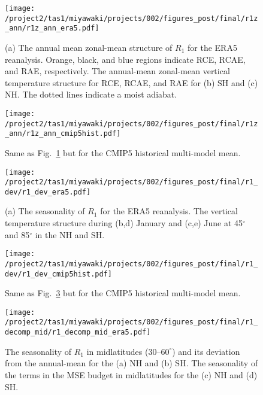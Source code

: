 \documentclass{ametsocV5}
\begin{document}
\begin{figure}[t]
  \noindent\texttt{[image: /project2/tas1/miyawaki/projects/002/figures\_post/final/r1z\_ann/r1z\_ann\_era5.pdf]}\\
  \caption{(a) The annual mean zonal-mean structure of $R_{1}$ for the ERA5 reanalysis. Orange, black, and blue regions indicate RCE, RCAE, and RAE, respectively. The annual-mean zonal-mean vertical temperature structure for RCE, RCAE, and RAE for (b) SH and (c) NH. The dotted lines indicate a moist adiabat.}
  \label{fig:era5-r1-ann}
\end{figure}

\begin{figure}[t]
  \noindent\texttt{[image: /project2/tas1/miyawaki/projects/002/figures\_post/final/r1z\_ann/r1z\_ann\_cmip5hist.pdf]}\\
  \caption{Same as Fig.~\ref{fig:era5-r1-ann} but for the CMIP5 historical multi-model mean.}
  \label{fig:cmip5hist-r1-ann}
\end{figure}

\begin{figure}[t]
  \noindent\texttt{[image: /project2/tas1/miyawaki/projects/002/figures\_post/final/r1\_dev/r1\_dev\_era5.pdf]}\\
  \caption{(a) The seasonality of $R_{1}$ for the ERA5 reanalysis. The vertical temperature structure during (b,d) January and (c,e) June at 45$^{\circ}$ and 85$^{\circ}$ in the NH and SH.}
  \label{fig:era5-r1-dev}
\end{figure}

\begin{figure}[t]
  \noindent\texttt{[image: /project2/tas1/miyawaki/projects/002/figures\_post/final/r1\_dev/r1\_dev\_cmip5hist.pdf]}\\
  \caption{Same as Fig.~\ref{fig:era5-r1-dev} but for the CMIP5 historical multi-model mean.}
  \label{fig:cmip5hist-r1-dev}
\end{figure}

\begin{figure}[t]
  \noindent\texttt{[image: /project2/tas1/miyawaki/projects/002/figures\_post/final/r1\_decomp\_mid/r1\_decomp\_mid\_era5.pdf]}\\
  \caption{The seasonality of $R_{1}$ in midlatitudes ($30$--$60^{\circ}$) and its deviation from the annual-mean for the (a) NH and (b) SH. The seasonality of the terms in the MSE budget in midlatitudes for the (c) NH and (d) SH.}
  \label{fig:era5-r1-decomp-mid}
\end{figure}
\end{document}
